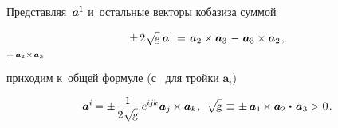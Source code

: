 \begin{otherlanguage}{russian}
Представляя~${\bm{a}^{\hspace{-0.1ex}1}\hspace{-0.1ex}}$ и~остальные векторы кобазиза суммой

\nopagebreak\vspace{.8em}\begin{equation*}
\begin{array}{l@{\hspace{.3em}}c@{\hspace{.36em}}r}
\pm \hspace{.33ex} 2 \hspace{.1ex} \scalebox{0.95}[0.96]{$\sqrt{\hspace{-0.36ex}\mathstrut{\textsl{g}}}$} \hspace{.5ex} \bm{a}^{\hspace{-0.1ex}1} & = & \bm{a}_2 \times \bm{a}_3 \hspace{.2ex} \tikzmark{BeginPlusToMinus} - \hspace{.2ex} \bm{a}_3 \times \bm{a}_2 \tikzmark{EndPlusToMinus}
\hspace{.2ex} ,
\end{array}
\end{equation*}%
%
{${\scriptstyle {+ \hspace{.4ex} \bm{a}_2 \hspace{.1ex} \times \hspace{.2ex} \bm{a}_3}}$}

\vspace{-1.3em} \noindent приходим к~общей формуле (с~\inquotes{$-$} для  тройки ${\bm{a}_i}$)

\nopagebreak\begin{equation}\label{basisvectorstocobasisvectors}
\bm{a}^{\hspace{-0.05ex}i} \hspace{-0.2ex}
= \displaystyle \pm \hspace{.2ex} \frac{\raisemath{-0.4ex}{1}}{2 \hspace{.1ex} \scalebox{0.95}[0.96]{$\sqrt{\hspace{-0.36ex}\mathstrut{\textsl{g}}}$}} \hspace{.5ex} e^{i\hspace{-0.1ex}j\hspace{-0.1ex}k} \hspace{.1ex} \bm{a}_j \hspace{-0.1ex} \times \bm{a}_k \hspace{.1ex},
\:\:
\sqrt{\hspace{-0.36ex}\mathstrut{\textsl{g}}} \hspace{.25ex}
\equiv \hspace{.15ex} \pm \hspace{.4ex} \bm{a}_1 \hspace{-0.2ex} \times \bm{a}_2 \hspace{.1ex} \dotp \hspace{.25ex} \bm{a}_3
> 0
\hspace{.2ex} .
\end{equation}


\end{otherlanguage}
